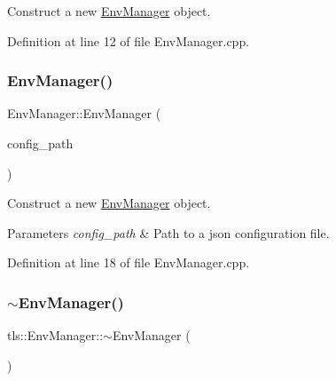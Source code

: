 Construct a new \hyperlink{classtls_1_1_env_manager}{Env\+Manager} object. 



Definition at line 12 of file Env\+Manager.\+cpp.

\mbox{\label{classtls_1_1_env_manager_ad603a242e488ddbda5a54b23aefe2013}} 
\subsubsection{\texorpdfstring{Env\+Manager()}{EnvManager()}\hspace{0.1cm}{\footnotesize\ttfamily [2/2]}}
{\footnotesize\ttfamily Env\+Manager\+::\+Env\+Manager (\begin{DoxyParamCaption}\item[{const std\+::filesystem\+::path \&}]{config\+\_\+path }\end{DoxyParamCaption})}



Construct a new \hyperlink{classtls_1_1_env_manager}{Env\+Manager} object. 


\begin{DoxyParams}{Parameters}
{\em config\+\_\+path} & Path to a json configuration file. \\
\hline
\end{DoxyParams}


Definition at line 18 of file Env\+Manager.\+cpp.

\mbox{\label{classtls_1_1_env_manager_aaff18dcf5a41cefdaa1a5b2123a456a0}} 
\subsubsection{\texorpdfstring{$\sim$\+Env\+Manager()}{~EnvManager()}}
{\footnotesize\ttfamily tls\+::\+Env\+Manager\+::$\sim$\+Env\+Manager (\begin{DoxyParamCaption}{ }\end{DoxyParamCaption})\hspace{0.3cm}{\ttfamily [default]}}



